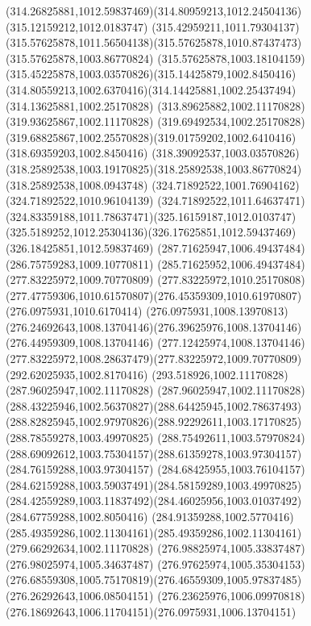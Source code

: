{{		\curveto(314.26825881,1012.59837469)(314.80959213,1012.24504136)(315.12159212,1012.0183747)
		\curveto(315.42959211,1011.79304137)(315.57625878,1011.56504138)(315.57625878,1010.87437473)
		\lineto(315.57625878,1003.86770824)
		\curveto(315.57625878,1003.18104159)(315.45225878,1003.03570826)(315.14425879,1002.8450416)
		\curveto(314.80559213,1002.6370416)(314.14425881,1002.25437494)(314.13625881,1002.25170828)
		\lineto(313.89625882,1002.11170828)
		\lineto(319.93625867,1002.11170828)
		\lineto(319.69492534,1002.25170828)
		\curveto(319.68825867,1002.25570828)(319.01759202,1002.6410416)(318.69359203,1002.8450416)
		\curveto(318.39092537,1003.03570826)(318.25892538,1003.19170825)(318.25892538,1003.86770824)
		\lineto(318.25892538,1008.0943748)
		\lineto(324.71892522,1001.76904162)
		\lineto(324.71892522,1010.96104139)
		\curveto(324.71892522,1011.64637471)(324.83359188,1011.78637471)(325.16159187,1012.0103747)
		\curveto(325.5189252,1012.25304136)(326.17625851,1012.59437469)(326.18425851,1012.59837469)
		\closepath
		\moveto(287.71625947,1006.49437484)
		\lineto(286.75759283,1009.10770811)
		\lineto(285.71625952,1006.49437484)
		\closepath
		\moveto(277.83225972,1009.70770809)
		\curveto(277.83225972,1010.25170808)(277.47759306,1010.61570807)(276.45359309,1010.61970807)
		\lineto(276.0975931,1010.6170414)
		\lineto(276.0975931,1008.13970813)
		\curveto(276.24692643,1008.13704146)(276.39625976,1008.13704146)(276.44959309,1008.13704146)
		\curveto(277.12425974,1008.13704146)(277.83225972,1008.28637479)(277.83225972,1009.70770809)
		\moveto(292.62025935,1002.8170416)
		\lineto(293.518926,1002.11170828)
		\lineto(287.96025947,1002.11170828)
		\curveto(287.96025947,1002.11170828)(288.43225946,1002.56370827)(288.64425945,1002.78637493)
		\curveto(288.82825945,1002.97970826)(288.92292611,1003.17170825)(288.78559278,1003.49970825)
		\curveto(288.75492611,1003.57970824)(288.69092612,1003.75304157)(288.61359278,1003.97304157)
		\lineto(284.76159288,1003.97304157)
		\curveto(284.68425955,1003.76104157)(284.62159288,1003.59037491)(284.58159289,1003.49970825)
		\curveto(284.42559289,1003.11837492)(284.46025956,1003.01037492)(284.67759288,1002.8050416)
		\curveto(284.91359288,1002.5770416)(285.49359286,1002.11304161)(285.49359286,1002.11304161)
		\lineto(279.66292634,1002.11170828)
		\lineto(276.98825974,1005.33837487)
		\lineto(276.98025974,1005.34637487)
		\lineto(276.97625974,1005.35304153)
		\curveto(276.68559308,1005.75170819)(276.46559309,1005.97837485)(276.26292643,1006.08504151)
		\curveto(276.23625976,1006.09970818)(276.18692643,1006.11704151)(276.0975931,1006.13704151)
}}
